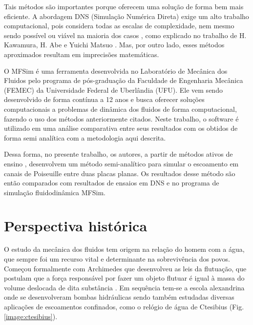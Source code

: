 Tais métodos são importantes porque oferecem uma solução de forma bem mais eficiente. A abordagem DNS (Simulação Numérica Direta) exige um alto trabalho computacional, pois considera todas as escalas de complexidade, nem mesmo sendo possível ou viável na maioria dos casos \cite{Kawamura}, como explicado no trabalho de H. Kawamura, H. Abe e Yuichi Matsuo \cite{Abe}. Mas, por outro lado, esses métodos aproximados resultam em imprecisões matemáticas.

O MFSim é uma ferramenta desenvolvida no Laboratório de Mecânica dos Fluidos pelo programa de pós-graduação da Faculdade de Engenharia Mecânica (FEMEC) da Universidade Federal de Uberlândia (UFU). Ele vem sendo desenvolvido de forma contínua a 12 anos e busca oferecer soluções computacionais a problemas de dinâmica dos fluidos de forma computacional, fazendo o uso dos métodos anteriormente citados. Neste trabalho, o software é utilizado em  uma análise comparativa entre seus resultados com os obtidos de forma semi analítica com a metodologia aqui descrita.

Dessa forma, no presente trabalho, os autores, a partir de métodos ativos de ensino \cite{CFD_in_learing}, desenvolvem um método semi-analítico para simular o escoamento em canais de Poiseuille \cite{Poiseuille} entre duas placas planas. Os resultados desse método são então comparados com resultados de ensaios em DNS e no programa de simulação fluidodinâmica MFSim.

\section{Perspectiva histórica}

O estudo da mecânica dos fluidos tem origem na relação do homem com a água, que sempre foi um recurso vital e determinante na sobrevivência dos povos. Começou formalmente com Archimedes que desenvolveu as leis da flutuação, que postulam que a força responsável por fazer um objeto flutuar é igual à massa do volume deslocada de dita substância \cite{dijksterhuis2014archimedes}. Em sequência tem-se a escola alexandrina onde se desenvolveram bombas hidráulicas sendo também estudadas diversas aplicações de escoamentos confinados, como o relógio de água de Ctesibius (Fig. \ref{image:ctesibius}).

